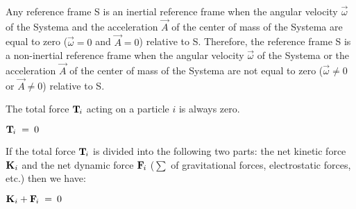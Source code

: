 \documentclass[10pt]{article}
\begin{document}
\par \bigskip \noindent Any reference frame S is an inertial reference frame when the angular velocity ${\vec{\omega}}$ of the Systema and the acceleration ${\vec{\mathit{A}}}$ of the center of mass of the Systema are equal to zero (\:${\vec{\omega}}=0$ {\hspace{+0.06em}\small and\hspace{+0.06em}} ${\vec{\mathit{A}}}=0$\:) relative to S. Therefore, the reference frame S is a non-inertial reference frame when the angular velocity ${\vec{\omega}}$ of the Systema or the acceleration ${\vec{\mathit{A}}}$ of the center of mass of the Systema are not equal to zero (\:${\vec{\omega}}\ne 0$ {\hspace{+0.06em}\small or\hspace{+0.06em}} ${\vec{\mathit{A}}}\ne 0$\:) relative to S.

\newpage

\par {}

\par \bigskip \noindent The total force ${\mathbf{T}}_{\hspace{-0.09em}i}$ acting on a particle $i$ is always zero.

\par \bigskip ${\mathbf{T}}_{\hspace{-0.09em}i} \;=\: \mathrm{0}$

\par \bigskip \noindent If the total force ${\mathbf{T}}_{\hspace{-0.09em}i}$ is divided into the following two parts: the net kinetic force ${\mathbf{K}}_{\hspace{+0.009em}i}$ and the net dynamic force ${\mathbf{F}}_{\hspace{-0.09em}i}$ (\hspace{+0.060em}$\sum$ of gravitational forces, electrostatic forces, etc.\hspace{+0.060em}) then we have:

\par \bigskip ${\mathbf{K}}_{\hspace{+0.009em}i} + {\mathbf{F}}_{\hspace{-0.09em}i} \;=\: \mathrm{0}$
\end{document}
